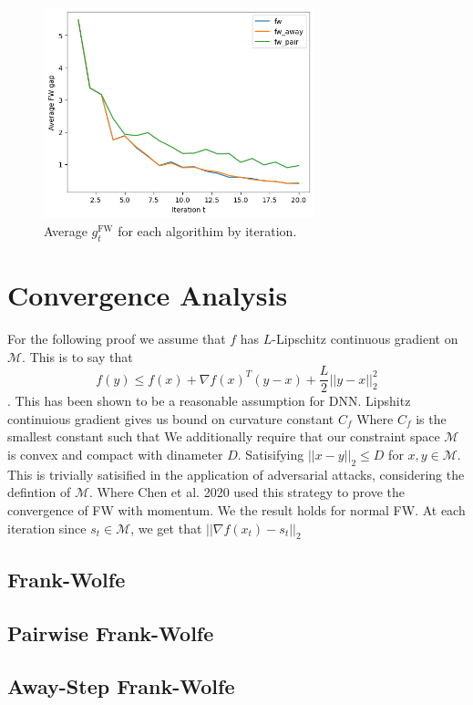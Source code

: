 \documentclass{article}
\begin{document}
\begin{figure}[h]
    \centering
    \includegraphics[width=0.7\textwidth]{plots/mdl_compare_avg_FWgap_by_iter.png}
    \caption{Average $g^\text{FW}_t$ for each algorithim by iteration.}
    \label{fig:converge-compare}
\end{figure}


\section{Convergence Analysis}
For the following proof we assume that $f$ has $L$-Lipschitz continuous gradient on $\mathcal{M}$. This is to say that 
$$ f(y) \leq f(x) + \nabla f(x)^T (y-x) + \frac{L}{2}||y-x||_2^2$$.
This has been shown to be a reasonable assumption for DNN. %
Lipshitz continuious gradient gives us bound on curvature constant $C_f$ %
Where $C_f$ is the smallest constant such that 
We additionally require that our constraint space $\mathcal{M}$ is convex and compact with dinameter $D$. Satisifying $||x-y||_2 \leq D$ for $x,y \in \mathcal{M}$. This is trivially satisified in the application of adversarial attacks, considering the defintion of $\mathcal{M}$. 
Where Chen et al. 2020 used this strategy to prove the convergence of FW with momentum. We the result holds for normal FW. 
At each iteration since $s_t \in \mathcal{M}$, we get that $||\nabla f(x_t) - s_t||_2$

\subsection{Frank-Wolfe}
\subsection{Pairwise Frank-Wolfe}
\subsection{Away-Step Frank-Wolfe}
\end{document}
